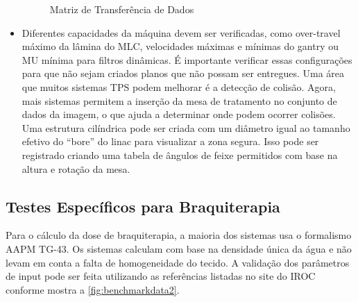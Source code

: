 \documentclass[11pt,a4paper]{article}
\begin{document}
\begin{itemize}[label=\textcolor{CarnationPink}{$\star$}]
		\begin{figure}[!h]
			\centering
			\caption{Matriz de Transferência de Dados}
			\label{fig:matrixTransferenciaDados}
		\end{figure}
	
		\item Diferentes capacidades da máquina devem ser verificadas, como over-travel máximo da lâmina do MLC, velocidades máximas e mínimas do gantry ou MU mínima para filtros dinâmicas. É importante verificar essas configurações para que não sejam criados planos que não possam ser entregues. Uma área que muitos sistemas TPS podem melhorar é a detecção de colisão. Agora, mais sistemas permitem a inserção da mesa de tratamento no conjunto de dados da imagem, o que ajuda a determinar onde podem ocorrer colisões. Uma estrutura cilíndrica pode ser criada com um diâmetro igual ao tamanho efetivo do “bore” do linac para visualizar a zona segura. Isso pode ser registrado criando uma tabela de ângulos de feixe permitidos com base na altura e rotação da mesa.
	
	\end{itemize}

\subsection*{Testes Específicos para Braquiterapia}

	Para o cálculo da dose de braquiterapia, a maioria dos sistemas usa o formalismo AAPM TG-43. Os sistemas calculam com base na densidade única da água e não levam em conta a falta de homogeneidade do tecido. A validação dos parâmetros de input pode ser feita utilizando as referências listadas no site do IROC conforme mostra a \ref{fig:benchmarkdata2}. 
	
\end{document}
